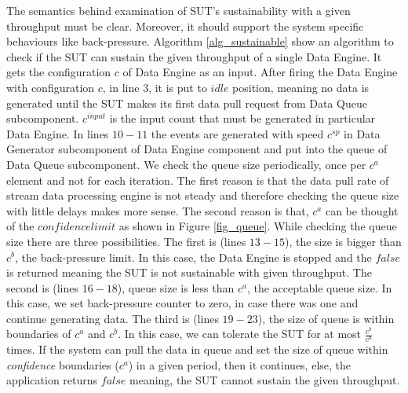 \documentclass{vldb}
\begin{document}
The semantics behind  examination of SUT's sustainability with a given throughput must be clear. Moreover, it should support the system specific behaviours like back-pressure. Algorithm \ref{alg_sustainable} show an algorithm to check if the  SUT can sustain  the given throughput of a single Data Engine. It gets the configuration $c$ of Data Engine as an input. After firing the Data Engine with configuration $c$, in line $3$, it is put to $idle$ position, meaning no data is generated until the SUT makes its first data pull request from Data Queue subcomponent. $c^{input}$ is the input count that must be generated in particular Data Engine.
 In lines $10-11$ the events are generated with speed $c^{sp}$ in Data Generator subcomponent of Data Engine component and put into the queue of Data Queue subcomponent. We check the queue size periodically, once per $c^{a}$ element and not for each iteration. The first reason is that the data pull rate of stream data processing engine is not steady and therefore checking the queue size with little delays makes more sense. The second reason is that, $c^{a}$ can be thought of the $confidence limit$ as shown in Figure \ref{fig_queue}. While checking the queue size there are three possibilities. The first is (lines $13-15$), the size is bigger than $c^{b}$, the back-pressure limit. In this case, the Data Engine is stopped and the $false$ is returned meaning the SUT is not sustainable with given throughput. The second is (lines $16-18$), queue size is less than $c^{a}$, the acceptable queue size. In this case, we set back-pressure counter to zero, in case there was one and continue generating data. The third is (lines $19-23$), the size   of queue is within boundaries of $c^{a}$ and $c^{b}$. In this case, we can tolerate the SUT for at most $\frac{c^{b}}{c^{a}}$ times. If the system can pull the data in queue and set the size of queue within \textit{confidence} boundaries ($c^{a}$) in a given period, then it continues, else, the application returns $false$ meaning, the SUT cannot sustain the given throughput. 
\end{document}
